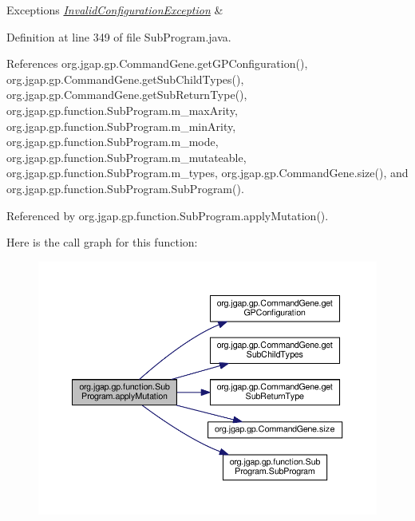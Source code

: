 \begin{DoxyExceptions}{Exceptions}
{\em \hyperlink{classorg_1_1jgap_1_1_invalid_configuration_exception}{Invalid\-Configuration\-Exception}} & \\
\hline
\end{DoxyExceptions}


Definition at line 349 of file Sub\-Program.\-java.



References org.\-jgap.\-gp.\-Command\-Gene.\-get\-G\-P\-Configuration(), org.\-jgap.\-gp.\-Command\-Gene.\-get\-Sub\-Child\-Types(), org.\-jgap.\-gp.\-Command\-Gene.\-get\-Sub\-Return\-Type(), org.\-jgap.\-gp.\-function.\-Sub\-Program.\-m\-\_\-max\-Arity, org.\-jgap.\-gp.\-function.\-Sub\-Program.\-m\-\_\-min\-Arity, org.\-jgap.\-gp.\-function.\-Sub\-Program.\-m\-\_\-mode, org.\-jgap.\-gp.\-function.\-Sub\-Program.\-m\-\_\-mutateable, org.\-jgap.\-gp.\-function.\-Sub\-Program.\-m\-\_\-types, org.\-jgap.\-gp.\-Command\-Gene.\-size(), and org.\-jgap.\-gp.\-function.\-Sub\-Program.\-Sub\-Program().



Referenced by org.\-jgap.\-gp.\-function.\-Sub\-Program.\-apply\-Mutation().



Here is the call graph for this function\-:
\nopagebreak
\begin{figure}[H]
\begin{center}
\leavevmode
\includegraphics[width=350pt]{classorg_1_1jgap_1_1gp_1_1function_1_1_sub_program_a9ef69a70d4ce63696a5825e6f1bbaae8_cgraph}
\end{center}
\end{figure}


